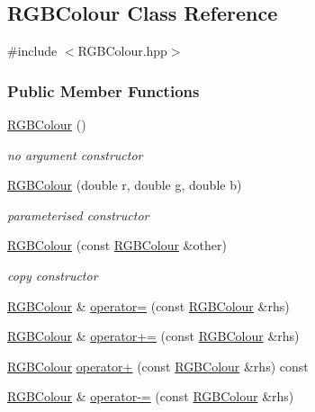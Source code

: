 \hypertarget{classRGBColour}{\subsection{\-R\-G\-B\-Colour \-Class \-Reference}
\label{classRGBColour}
}


{\ttfamily \#include $<$\-R\-G\-B\-Colour.\-hpp$>$}

\subsubsection*{\-Public \-Member \-Functions}
\begin{DoxyCompactItemize}
\item 
\hyperlink{classRGBColour_ac7560f6df5568511e29da518f20960b9}{\-R\-G\-B\-Colour} ()
\begin{DoxyCompactList}\small\item\em no argument constructor \end{DoxyCompactList}\item 
\hyperlink{classRGBColour_ae19ea292a3754c4af6972f643e86dd5e}{\-R\-G\-B\-Colour} (double r, double g, double b)
\begin{DoxyCompactList}\small\item\em parameterised constructor \end{DoxyCompactList}\item 
\hyperlink{classRGBColour_aff6468f7598680fbcccc7430de435961}{\-R\-G\-B\-Colour} (const \hyperlink{classRGBColour}{\-R\-G\-B\-Colour} \&other)
\begin{DoxyCompactList}\small\item\em copy constructor \end{DoxyCompactList}\item 
\hyperlink{classRGBColour}{\-R\-G\-B\-Colour} \& \hyperlink{classRGBColour_a12d83c5eafe55b9aab5c62cc47c4d495}{operator=} (const \hyperlink{classRGBColour}{\-R\-G\-B\-Colour} \&rhs)
\item 
\hyperlink{classRGBColour}{\-R\-G\-B\-Colour} \& \hyperlink{classRGBColour_a7bc8965e22d903453aaff8a7aa05c107}{operator+=} (const \hyperlink{classRGBColour}{\-R\-G\-B\-Colour} \&rhs)
\item 
\hyperlink{classRGBColour}{\-R\-G\-B\-Colour} \hyperlink{classRGBColour_a713238eb960ab76b5be90d9052e6decd}{operator+} (const \hyperlink{classRGBColour}{\-R\-G\-B\-Colour} \&rhs) const 
\item 
\hyperlink{classRGBColour}{\-R\-G\-B\-Colour} \& \hyperlink{classRGBColour_aef34c776d78d25b97c12f53010fdb383}{operator-\/=} (const \hyperlink{classRGBColour}{\-R\-G\-B\-Colour} \&rhs)

\end{DoxyCompactItemize}
